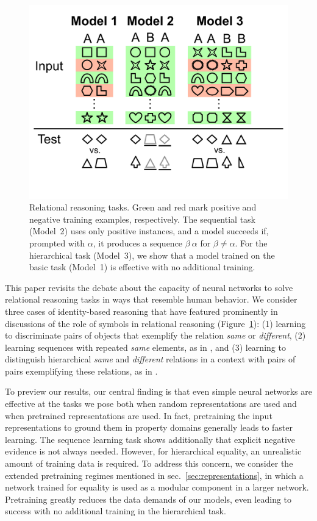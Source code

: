 \documentclass{article}
\newcommand{\secref}[1]{sec.~\ref{#1}}
\newcommand{\figref}[1]{Figure~\ref{#1}}
\newcommand{\update}[1]{{\color{darkblue}#1}}
\newcommand{\updatea}[1]{{\color{darkred}#1}}
\begin{document}
\begin{figure}[tp]
  \centering
  \includegraphics[scale=0.20]{modelfigv1.pdf}
  \caption{Relational reasoning tasks. Green and red mark positive and negative training examples, respectively. The sequential task (Model~2) uses only positive instances, and a model succeeds if, prompted with $\alpha$, it produces a sequence $\beta \ \alpha$ for $\beta \neq \alpha$. For the hierarchical task (Model~3), we show that a model trained on the basic task (Model~1) is effective with no additional training.}
  \label{fig:tasks}
\end{figure}

This paper revisits the debate about the capacity of neural networks to solve relational reasoning tasks in ways that resemble human behavior. We consider three cases of identity-based reasoning that have featured prominently in discussions of the role of symbols in relational reasoning (\figref{fig:tasks}): (1) learning to discriminate pairs of objects that exemplify the relation \emph{same} or \emph{different}, (2) learning sequences with repeated \emph{same} elements, as in \citet{marcus:1999}, and (3) learning to distinguish hierarchical \emph{same} and \emph{different} relations in a context with pairs of pairs exemplifying these relations, as in \citet{Premack:1983}.

To preview our results, our central finding is that even simple neural networks are effective at the tasks we pose both when random representations are used and when pretrained representations are used. In fact, \updatea{ pretraining the input representations to ground them in property domains generally leads to faster learning}.  The sequence learning task shows additionally that explicit negative evidence is not always needed. However, for hierarchical equality, an unrealistic amount of training data is required. To address this concern, we consider the \update{extended pretraining regimes mentioned in \secref{sec:representations}, in which a network trained for equality is used as a modular component in a larger network.} Pretraining greatly reduces the data demands of our models, even leading to success with no additional training in the hierarchical task.
\end{document}
